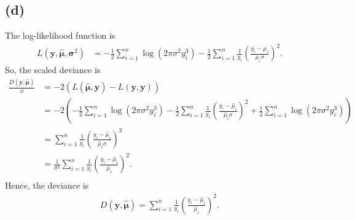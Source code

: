 \subsection*{(d)}
The log-likelihood function is
\begin{align*}
L(\bm{y},\widehat{\bm{\mu}},\bm{\sigma}^{2}) &= -\frac{1}{2}\sum_{i=1}^{n}\log\left(2\pi\sigma^{2}y_{i}^{3}\right) -\frac{1}{2}\sum_{i=1}^{n}\frac{1}{y_{i}}\left(\frac{y_{i}-\mu_{i}}{\mu_{i}\sigma}\right)^{2}.
\end{align*}
So, the scaled deviance is
\begin{align*}
\frac{D(\bm{y},\widehat{\bm{\mu}})}{\phi} &= -2\left(L\left(\widehat{\bm{\mu}},\bm{y}\right) - L\left(\bm{y},\bm{y}\right)\right)\\
&= -2\left(-\frac{1}{2}\sum_{i=1}^{n}\log\left(2\pi\sigma^{2}y_{i}^{3}\right) -\frac{1}{2}\sum_{i=1}^{n}\frac{1}{y_{i}}\left(\frac{y_{i}-\widehat{\mu}_{i}}{\widehat{\mu}_{i}\sigma}\right)^{2} + \frac{1}{2}\sum_{i=1}^{n}\log\left(2\pi\sigma^{2}y_{i}^{3}\right)\right)\\
&= \sum_{i=1}^{n}\frac{1}{y_{i}}\left(\frac{y_{i}-\widehat{\mu}_{i}}{\widehat{\mu}_{i}\sigma}\right)^{2}\\
&= \frac{1}{\sigma^{2}}\sum_{i=1}^{n}\frac{1}{y_{i}}\left(\frac{y_{i}-\widehat{\mu}_{i}}{\widehat{\mu}_{i}}\right)^{2}.\\
\end{align*}
Hence, the deviance is
\begin{align*}
D(\bm{y},\widehat{\bm{\mu}}) = \sum_{i=1}^{n}\frac{1}{y_{i}}\left(\frac{y_{i}-\widehat{\mu}_{i}}{\widehat{\mu}_{i}}\right)^{2}.
\end{align*}
